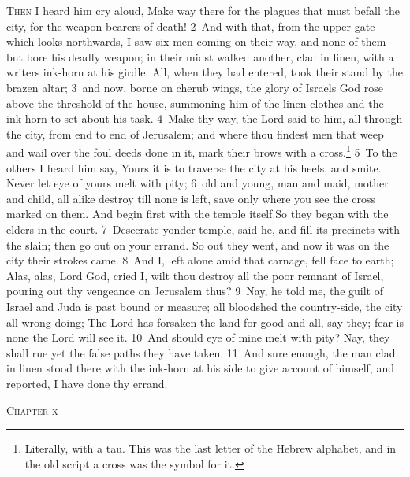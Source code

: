 \documentclass[10pt]{book} %
\begin{document}
\lettrine[lines=2]{T}{hen} I heard him cry aloud, Make way there for the plagues that must befall the city, for the weapon-bearers of death! \textcolor{benred8}{2}~And with that, from the upper gate which looks northwards, I saw six men coming on their way, and none of them but bore his deadly weapon; in their midst walked another, clad in linen, with a writer\textquotesingle s ink-horn at his girdle. All, when they had entered, took their stand by the brazen altar; \textcolor{benred8}{3}~and now, borne on cherub wings, the glory of Israel\textquotesingle s God rose above the threshold of the house, summoning him of the linen clothes and the ink-horn to set about his task. \textcolor{benred8}{4}~Make thy way, the Lord said to him, all through the city, from end to end of Jerusalem; and where thou findest men that weep and wail over the foul deeds done in it, mark their brows with a cross.\footnote[1]{Literally, \textasciigrave with a tau\textquotesingle . This was the last letter of the Hebrew alphabet, and in the old script a cross was the symbol for it.} \textcolor{benred8}{5}~To the others I heard him say, Yours it is to traverse the city at his heels, and smite. Never let eye of yours melt with pity; \textcolor{benred8}{6}~old and young, man and maid, mother and child, all alike destroy till none is left, save only where you see the cross marked on them. And begin first with the temple itself.So they began with the elders in the court. \textcolor{benred8}{7}~Desecrate yonder temple, said he, and fill its precincts with the slain; then go out on your errand. So out they went, and now it was on the city their strokes came. \textcolor{benred8}{8}~And I, left alone amid that carnage, fell face to earth; Alas, alas, Lord God, cried I, wilt thou destroy all the poor remnant of Israel, pouring out thy vengeance on Jerusalem thus? \textcolor{benred8}{9}~Nay, he told me, the guilt of Israel and Juda is past bound or measure; all bloodshed the country-side, the city all wrong-doing; The Lord has forsaken the land for good and all, say they; fear is none the Lord will see it. \textcolor{benred8}{10}~And should eye of mine melt with pity? Nay, they shall rue yet the false paths they have taken. \textcolor{benred8}{11}~And sure enough, the man clad in linen stood there with the ink-horn at his side to give account of himself, and reported, I have done thy errand.
\begin{large}\begin{center}\textsc{Chapter x}\end{center}\end{large}
\end{document}
